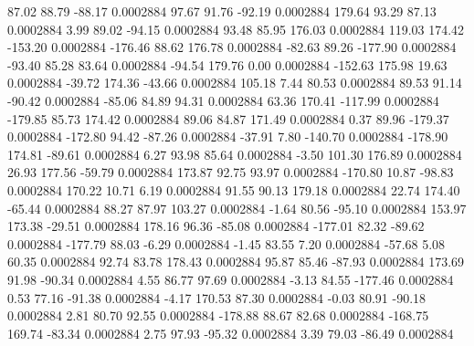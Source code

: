        87.02       88.79      -88.17     0.0002884
       97.67       91.76      -92.19     0.0002884
      179.64       93.29       87.13     0.0002884
        3.99       89.02      -94.15     0.0002884
       93.48       85.95      176.03     0.0002884
      119.03      174.42     -153.20     0.0002884
     -176.46       88.62      176.78     0.0002884
      -82.63       89.26     -177.90     0.0002884
      -93.40       85.28       83.64     0.0002884
      -94.54      179.76        0.00     0.0002884
     -152.63      175.98       19.63     0.0002884
      -39.72      174.36      -43.66     0.0002884
      105.18        7.44       80.53     0.0002884
       89.53       91.14      -90.42     0.0002884
      -85.06       84.89       94.31     0.0002884
       63.36      170.41     -117.99     0.0002884
     -179.85       85.73      174.42     0.0002884
       89.06       84.87      171.49     0.0002884
        0.37       89.96     -179.37     0.0002884
     -172.80       94.42      -87.26     0.0002884
      -37.91        7.80     -140.70     0.0002884
     -178.90      174.81      -89.61     0.0002884
        6.27       93.98       85.64     0.0002884
       -3.50      101.30      176.89     0.0002884
       26.93      177.56      -59.79     0.0002884
      173.87       92.75       93.97     0.0002884
     -170.80       10.87      -98.83     0.0002884
      170.22       10.71        6.19     0.0002884
       91.55       90.13      179.18     0.0002884
       22.74      174.40      -65.44     0.0002884
       88.27       87.97      103.27     0.0002884
       -1.64       80.56      -95.10     0.0002884
      153.97      173.38      -29.51     0.0002884
      178.16       96.36      -85.08     0.0002884
     -177.01       82.32      -89.62     0.0002884
     -177.79       88.03       -6.29     0.0002884
       -1.45       83.55        7.20     0.0002884
      -57.68        5.08       60.35     0.0002884
       92.74       83.78      178.43     0.0002884
       95.87       85.46      -87.93     0.0002884
      173.69       91.98      -90.34     0.0002884
        4.55       86.77       97.69     0.0002884
       -3.13       84.55     -177.46     0.0002884
        0.53       77.16      -91.38     0.0002884
       -4.17      170.53       87.30     0.0002884
       -0.03       80.91      -90.18     0.0002884
        2.81       80.70       92.55     0.0002884
     -178.88       88.67       82.68     0.0002884
     -168.75      169.74      -83.34     0.0002884
        2.75       97.93      -95.32     0.0002884
        3.39       79.03      -86.49     0.0002884
